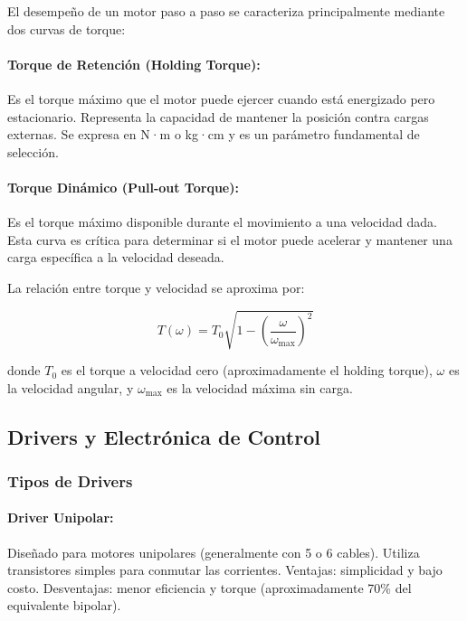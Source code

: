 El desempeño de un motor paso a paso se caracteriza principalmente mediante dos curvas de torque:

\paragraph{Torque de Retención (Holding Torque):}

Es el torque máximo que el motor puede ejercer cuando está energizado pero estacionario. Representa la capacidad de mantener la posición contra cargas externas. Se expresa en N·m o kg·cm y es un parámetro fundamental de selección.

\paragraph{Torque Dinámico (Pull-out Torque):}

Es el torque máximo disponible durante el movimiento a una velocidad dada. Esta curva es crítica para determinar si el motor puede acelerar y mantener una carga específica a la velocidad deseada.

La relación entre torque y velocidad se aproxima por:

\begin{equation}
T(\omega) = T_0 \sqrt{1 - \left(\frac{\omega}{\omega_{\max}}\right)^2}
\end{equation}

donde $T_0$ es el torque a velocidad cero (aproximadamente el holding torque), $\omega$ es la velocidad angular, y $\omega_{\max}$ es la velocidad máxima sin carga.

\subsection{Drivers y Electrónica de Control}

\subsubsection{Tipos de Drivers}

\paragraph{Driver Unipolar:}

Diseñado para motores unipolares (generalmente con 5 o 6 cables). Utiliza transistores simples para conmutar las corrientes. Ventajas: simplicidad y bajo costo. Desventajas: menor eficiencia y torque (aproximadamente 70\% del equivalente bipolar).

